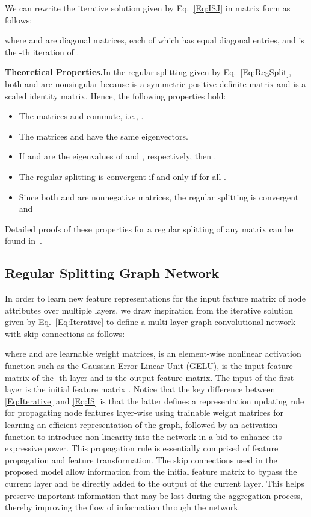 \documentclass[10pt,journal]{IEEEtran}
\begin{document}
\medskip\noindent We can rewrite the iterative solution given by Eq.~\eqref{Eq:ISJ} in matrix form as follows:

where  and  are  diagonal matrices, each of which has equal diagonal entries, and  is the -th iteration of .

\medskip\noindent\textbf{Theoretical Properties.}\quad In the regular splitting  given by Eq.~\eqref{Eq:RegSplit}, both  and  are nonsingular because  is a symmetric positive definite matrix and  is a scaled identity matrix. Hence, the following properties hold:
\begin{itemize}
\item The matrices  and  commute, i.e., .
\item The matrices  and  have the same eigenvectors.
\item If  and  are the eigenvalues of  and , respectively, then .
\item The regular splitting is convergent if and only if  for all .
\item Since both  and  are nonnegative matrices, the regular splitting is convergent and

\end{itemize}
Detailed proofs of these properties for a regular splitting of any matrix can be found in~\cite{Woznicki:01}.	

\subsection{Regular Splitting Graph Network}
In order to learn new feature representations for the input feature matrix of node attributes over multiple layers, we draw inspiration from the iterative solution given by Eq.~\eqref{Eq:Iterative} to define a multi-layer graph convolutional network with skip connections as follows:

where  and  are learnable weight matrices,  is an element-wise nonlinear activation function such as the Gaussian Error Linear Unit (GELU),  is the input feature matrix of the -th layer and  is the output feature matrix. The input of the first layer is the initial feature matrix . Notice that the key difference between \eqref{Eq:Iterative} and \eqref{Eq:IS} is that the latter defines a representation updating rule for propagating node features layer-wise using trainable weight matrices for learning an efficient representation of the graph, followed by an activation function to introduce non-linearity into the network in a bid to enhance its expressive power. This propagation rule is essentially comprised of feature propagation and feature transformation. The skip connections used in the proposed model allow information from the initial feature matrix to bypass the current layer and be directly added to the output of the current layer. This helps preserve important information that may be lost during the aggregation process, thereby improving the flow of information through the network.
	
\end{document}
